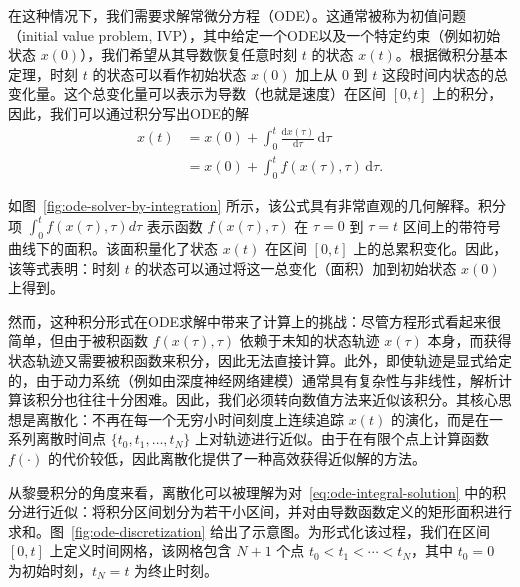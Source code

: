 在这种情况下，我们需要求解常微分方程（ODE）。这通常被称为初值问题（initial value problem, IVP），其中给定一个ODE以及一个特定约束（例如初始状态 $x(0)$），我们希望从其导数恢复任意时刻 $t$ 的状态 $x(t)$。根据微积分基本定理，时刻 \(t\) 的状态可以看作初始状态 \(x(0)\) 加上从 \(0\) 到 \(t\) 这段时间内状态的总变化量。这个总变化量可以表示为导数（也就是速度）在区间 \([0,t]\) 上的积分，因此，我们可以通过积分写出ODE的解
\begin{equation}
\begin{aligned}
x(t)
&= x(0)+\int_0^t \frac{\mathrm{d}x(\tau)}{\mathrm{d}\tau}\,\mathrm{d}\tau \\
&= x(0)+\int_0^t f(x(\tau),\tau)\,\mathrm{d}\tau .
\end{aligned}
\label{eq:ode-integral-solution}
\end{equation}

如图~\ref{fig:ode-solver-by-integration} 所示，该公式具有非常直观的几何解释。积分项 $\int_0^t f(x(\tau),\tau)d\tau$ 表示函数 $f(x(\tau),\tau)$ 在 $\tau=0$ 到 $\tau=t$ 区间上的带符号曲线下的面积。该面积量化了状态 $x(t)$ 在区间 $[0,t]$ 上的总累积变化。因此，该等式表明：时刻 $t$ 的状态可以通过将这一总变化（面积）加到初始状态 $x(0)$ 上得到。

然而，这种积分形式在ODE求解中带来了计算上的挑战：尽管方程形式看起来很简单，但由于被积函数 $f(x(\tau),\tau)$ 依赖于未知的状态轨迹 $x(\tau)$ 本身，而获得状态轨迹又需要被积函数来积分，因此无法直接计算。此外，即使轨迹是显式给定的，由于动力系统（例如由深度神经网络建模）通常具有复杂性与非线性，解析计算该积分也往往十分困难。因此，我们必须转向数值方法来近似该积分。其核心思想是离散化：不再在每一个无穷小时间刻度上连续追踪 $x(t)$ 的演化，而是在一系列离散时间点 $\{t_0,t_1,\ldots,t_N\}$ 上对轨迹进行近似。由于在有限个点上计算函数 $f(\cdot)$ 的代价较低，因此离散化提供了一种高效获得近似解的方法。

从黎曼积分的角度来看，离散化可以被理解为对~\eqref{eq:ode-integral-solution} 中的积分进行近似：将积分区间划分为若干小区间，并对由导数函数定义的矩形面积进行求和。图~\ref{fig:ode-discretization} 给出了示意图。为形式化该过程，我们在区间 $[0,t]$ 上定义时间网格，该网格包含 $N+1$ 个点 $t_0<t_1<\cdots<t_N$，其中 $t_0=0$ 为初始时刻，$t_N=t$ 为终止时刻。

